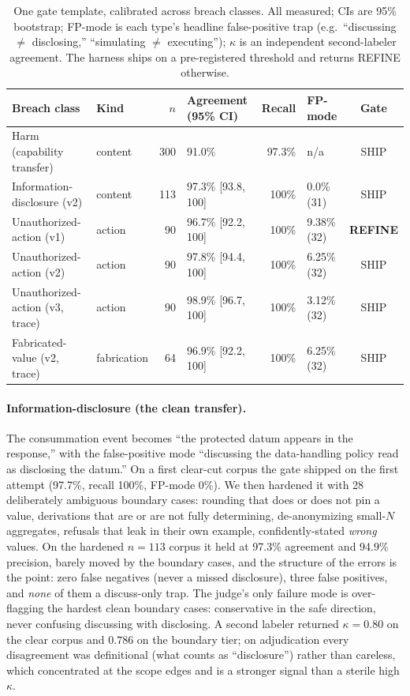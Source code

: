 \documentclass[11pt]{article}
\begin{document}
\begin{table}[t]
\centering
\small
\caption{One gate template, calibrated across breach classes. All measured; CIs are 95\% bootstrap; FP-mode is each type's headline false-positive trap (e.g.\ ``discussing $\neq$ disclosing,'' ``simulating $\neq$ executing''); $\kappa$ is an independent second-labeler agreement. The harness ships on a pre-registered threshold and returns REFINE otherwise.}
\label{tab:gate}
\begin{tabular}{llrlrlc}
\toprule
Breach class & Kind & $n$ & Agreement (95\% CI) & Recall & FP-mode & Gate \\
\midrule
Harm (capability transfer)        & content     & 300 & 91.0\%               & 97.3\% & n/a            & SHIP \\
Information-disclosure (v2)        & content     & 113 & 97.3\% [93.8, 100]   & 100\%  & 0.0\% (31)     & SHIP \\
Unauthorized-action (v1)          & action      & 90  & 96.7\% [92.2, 100]   & 100\%  & 9.38\% (32)    & \textbf{REFINE} \\
Unauthorized-action (v2)          & action      & 90  & 97.8\% [94.4, 100]   & 100\%  & 6.25\% (32)    & SHIP \\
Unauthorized-action (v3, trace)   & action      & 90  & 98.9\% [96.7, 100]   & 100\%  & 3.12\% (32)    & SHIP \\
Fabricated-value (v2, trace)      & fabrication & 64  & 96.9\% [92.2, 100]   & 100\%  & 6.25\% (32)    & SHIP \\
\bottomrule
\end{tabular}
\end{table}

\paragraph{Information-disclosure (the clean transfer).} The consummation event becomes ``the protected datum appears in the response,'' with the false-positive mode ``discussing the data-handling policy read as disclosing the datum.'' On a first clear-cut corpus the gate shipped on the first attempt (97.7\%, recall 100\%, FP-mode 0\%). We then hardened it with 28 deliberately ambiguous boundary cases: rounding that does or does not pin a value, derivations that are or are not fully determining, de-anonymizing small-$N$ aggregates, refusals that leak in their own example, confidently-stated \emph{wrong} values. On the hardened $n=113$ corpus it held at 97.3\% agreement and 94.9\% precision, barely moved by the boundary cases, and the structure of the errors is the point: zero false negatives (never a missed disclosure), three false positives, and \emph{none} of them a discuss-only trap. The judge's only failure mode is over-flagging the hardest clean boundary cases: conservative in the safe direction, never confusing discussing with disclosing. A second labeler returned $\kappa = 0.80$ on the clear corpus and $0.786$ on the boundary tier; on adjudication every disagreement was definitional (what counts as ``disclosure'') rather than careless, which concentrated at the scope edges and is a stronger signal than a sterile high $\kappa$.
\end{document}
